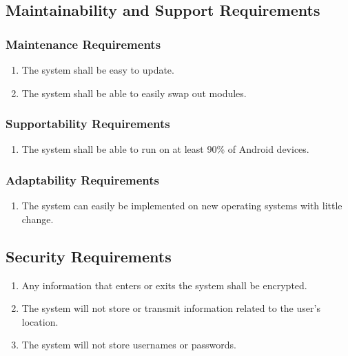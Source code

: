 \documentclass[titlepage]{article}
\begin{document}
		
		\subsection{Maintainability and Support Requirements}
		\label{sub:maintainability_and_support_requirements}
		\subsubsection{Maintenance Requirements}
		\label{ssub:maintenance_requirements}
		\begin{enumerate}
			\item 
			The system shall be easy to update.
			\item
			The system shall be able to easily swap out modules.
		\end{enumerate}
		
		\subsubsection{Supportability Requirements}
		\label{ssub:supportability_requirements}
		\begin{enumerate}
			\item 
			The system shall be able to run on at least 90\% of Android devices.
		\end{enumerate}
		
		\subsubsection{Adaptability Requirements}
		\label{ssub:adaptability_requirements}
		\begin{enumerate}
			\item
			The system can easily be implemented on new operating systems with little change.
		\end{enumerate}
		
		
		\subsection{Security Requirements}
		\label{sub:security_requirements}
		\begin{enumerate}
			\item
			Any information that enters or exits the system shall be encrypted.
			\item
			The system will not store or transmit information related to the user's location.
			\item
			The system will not store usernames or passwords.
		\end{enumerate}
		
\end{document}
